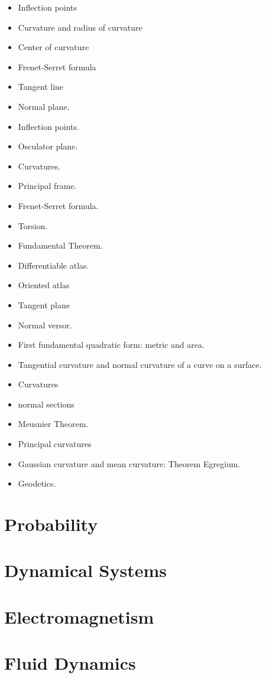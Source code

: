 \documentclass[10pt]{article}
\begin{document}
\begin{itemize}
	\item Inflection points
	\item Curvature and radius of curvature
	\item Center of curvature
	\item Frenet-Serret formula
	\item Tangent line
	\item Normal plane.
	\item Inflection points.
	\item Osculator plane.
	\item Curvatures.
	\item Principal frame.
	\item Frenet-Serret formula.
	\item Torsion.
	\item Fundamental Theorem.
	\item Differentiable atlas.
	\item Oriented atlas
	\item Tangent plane
	\item Normal versor.
	\item First fundamental quadratic form: metric and area.
	\item Tangential curvature and normal curvature of a curve on a surface.
	\item Curvatures
	\item normal sections
	\item Meusnier Theorem.
	\item Principal curvatures
	\item Gaussian curvature and mean curvature: Theorem Egregium.
	\item Geodetics. 
\end{itemize}

\section{Probability}

\section{Dynamical Systems}

\section{Electromagnetism}

\section{Fluid Dynamics}
\end{document}
